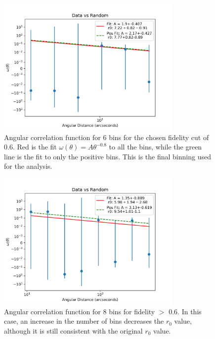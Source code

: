 \begin{figure}[!tbp]
\centering \includegraphics[width=90mm]{clustering_two/Data_vs_Random_10000_bin6_sn0_6_NFalse.png}
\caption{Angular correlation function for 6 bins for the chosen fidelity cut of 0.6. Red is the fit $\omega(\theta) = A\theta^{-0.8}$ to all the bins, while the green line is the fit to only the positive bins. This is the final binning used for the analysis. }
\label{fig:Angular_binnings}
\end{figure}

\begin{figure}[!tbp]
\centering \includegraphics[width=90mm]{clustering_two/Data_vs_Random_10000_bin8_sn0_6_NFalse.png}
\caption{Angular correlation function for 8 bins  for fidelity $>$ 0.6. In this case, an increase in the number of bins decreases the $r_0$ value, although it is still consistent with the original $r_0$ value.}
\label{fig:Angular_bin_8}
\end{figure}

